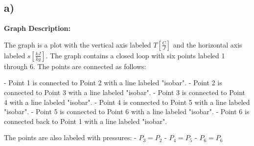 

\subsection*{a)}

\begin{center}
\textbf{Graph Description:}
\end{center}

The graph is a plot with the vertical axis labeled \( T \left[ \frac{C}{J} \right] \) and the horizontal axis labeled \( s \left[ \frac{kJ}{kg} \right] \). The graph contains a closed loop with six points labeled 1 through 6. The points are connected as follows:

- Point 1 is connected to Point 2 with a line labeled "isobar".
- Point 2 is connected to Point 3 with a line labeled "isobar".
- Point 3 is connected to Point 4 with a line labeled "isobar".
- Point 4 is connected to Point 5 with a line labeled "isobar".
- Point 5 is connected to Point 6 with a line labeled "isobar".
- Point 6 is connected back to Point 1 with a line labeled "isobar".

The points are also labeled with pressures:
- \( P_3 = P_2 \)
- \( P_4 = P_5 \)
- \( P_6 = P_6 \)